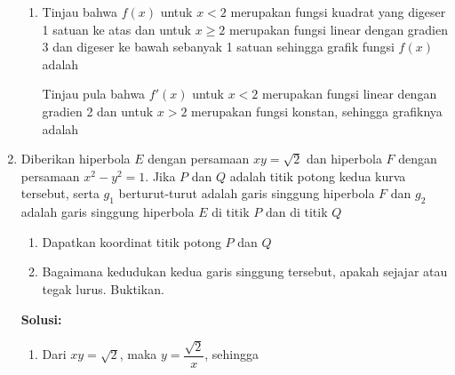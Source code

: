 \documentclass{article}
\begin{document}
\begin{enumerate}
\begin{enumerate}
		\item Tinjau bahwa $f(x)$ untuk $x<2$ merupakan fungsi kuadrat yang digeser 1 satuan ke atas dan untuk $x\geq 2$ merupakan fungsi linear dengan gradien 3 dan digeser ke bawah sebanyak 1 satuan sehingga grafik fungsi $f(x)$ adalah 
		\begin{center}
		\end{center}
		Tinjau pula bahwa $f'(x)$ untuk $x<2$ merupakan fungsi linear dengan gradien 2 dan untuk $x>2$ merupakan fungsi konstan, sehingga grafiknya adalah
		\begin{center}
		\end{center}
	\end{enumerate}
	\item Diberikan hiperbola $E$ dengan persamaan $xy=\sqrt{2}$ dan hiperbola $F$ dengan persamaan $x^2-y^2=1$. Jika $P$ dan $Q$ adalah titik potong kedua kurva tersebut, serta $g_1$ berturut-turut adalah garis singgung hiperbola $F$ dan $g_2$ adalah garis singgung hiperbola $E$ di titik $P$ dan di titik $Q$
	\begin{enumerate}
		\item Dapatkan koordinat titik potong $P$ dan $Q$
		\item Bagaimana kedudukan kedua garis singgung tersebut, apakah sejajar atau tegak lurus. Buktikan.
	\end{enumerate}
	\textbf{Solusi:}
	\begin{enumerate}
		\item Dari $xy=\sqrt{2}$, maka $y=\dfrac{\sqrt{2}}{x}$, sehingga 

\end{enumerate}
\end{enumerate}
\end{document}
